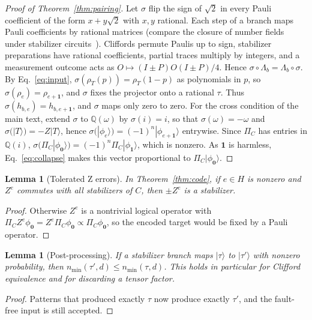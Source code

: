 \documentclass[aps,prl,reprint,twocolumn,amsmath,amssymb,floatfix,nofootinbib,superscriptaddress]{revtex4-2}
\newtheorem{lemma}[theorem]{Lemma}
\begin{document}
\begin{proof}[Proof of Theorem~\ref{thm:pairing}]
Let $\sigma$ flip the sign of $\sqrt2$ in every Pauli coefficient of the form $x+y\sqrt2$ with $x,y$ rational. Each step of a branch maps Pauli coefficients by rational matrices (compare the closure of number fields under stabilizer circuits~\cite[Theorem~2.8]{beverland}). Cliffords permute Paulis up to sign, stabilizer preparations have rational coefficients, partial traces multiply by integers, and a measurement outcome acts as $O\mapsto(I\pm P)O(I\pm P)/4$. Hence $\sigma\circ\Lambda_b=\Lambda_b\circ\sigma$. By Eq.~\eqref{eq:input}, $\sigma(\rho_T(p))=\rho_T(1-p)$ as polynomials in $p$, so $\sigma(\rho_e)=\rho_{e+\mathbf1}$, and $\sigma$ fixes the projector onto a rational $\tau$. Thus $\sigma(h_{b,e})=h_{b,e+\mathbf1}$, and $\sigma$ maps only zero to zero. For the cross condition of the main text, extend $\sigma$ to $\mathbb Q(\omega)$ by $\sigma(i)=i$, so that $\sigma(\omega)=-\omega$ and $\sigma(|T\rangle)=-Z|T\rangle$, hence $\sigma(|\phi_e\rangle)=(-1)^n|\phi_{e+\mathbf1}\rangle$ entrywise. Since $\Pi_C$ has entries in $\mathbb Q(i)$, $\sigma(\Pi_C|\phi_{\mathbf0}\rangle)=(-1)^n\Pi_C|\phi_{\mathbf1}\rangle$, which is nonzero. As $\mathbf1$ is harmless, Eq.~\eqref{eq:collapse} makes this vector proportional to $\Pi_C|\phi_{\mathbf0}\rangle$.
\end{proof}

\begin{lemma}[Tolerated Z errors]\label{lem:logical}
In Theorem~\ref{thm:code}, if $e\in H$ is nonzero and $Z^e$ commutes with all stabilizers of $C$, then $\pm Z^e$ is a stabilizer.
\end{lemma}
\begin{proof}
Otherwise $Z^e$ is a nontrivial logical operator with $\Pi_CZ^e\phi_{\mathbf0}=Z^e\Pi_C\phi_{\mathbf0}\propto\Pi_C\phi_{\mathbf0}$, so the encoded target would be fixed by a Pauli operator.
\end{proof}

\begin{lemma}[Post-processing]\label{lem:post}
If a stabilizer branch maps $|\tau\rangle$ to $|\tau'\rangle$ with nonzero probability, then $n_{\min}(\tau',d)\leq n_{\min}(\tau,d)$. This holds in particular for Clifford equivalence and for discarding a tensor factor.
\end{lemma}
\begin{proof}
Patterns that produced exactly $\tau$ now produce exactly $\tau'$, and the fault-free input is still accepted.
\end{proof}
\end{document}

